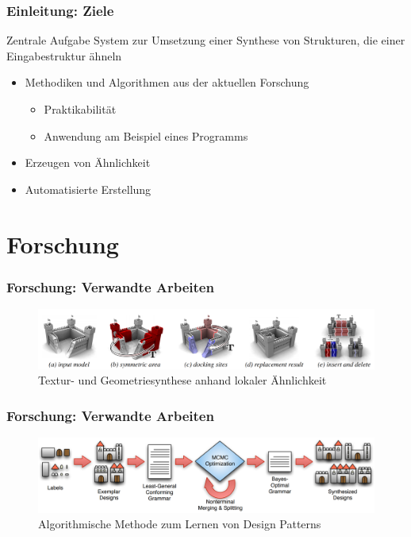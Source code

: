 \documentclass[12pt]{beamer}
\begin{document}
    \begin{frame}
        \frametitle{Einleitung: Ziele}

        \begin{block}{Zentrale Aufgabe}
            System zur Umsetzung einer Synthese von Strukturen, die einer Eingabestruktur ähneln
        \end{block}

        \begin{itemize}
            \setlength\itemsep{1.4em}
            \item Methodiken und Algorithmen aus der aktuellen Forschung
            \begin{itemize}
                \item Praktikabilität
                \item Anwendung am Beispiel eines Programms
            \end{itemize}
            \item Erzeugen von Ähnlichkeit
            \item Automatisierte Erstellung
        \end{itemize}
    \end{frame}

    \section{Forschung}
    \label{sec:forschung}
    \begin{frame}
        \frametitle{Forschung: Verwandte Arbeiten}
        
        \begin{figure}
            \centering
            \includegraphics[width=12cm]{../images/bokeloh_2010_system.PNG}
            \caption{Textur- und Geometriesynthese anhand lokaler Ähnlichkeit}
        \end{figure}
    \end{frame}

    \begin{frame}
        \frametitle{Forschung: Verwandte Arbeiten}

        \begin{figure}
            \centering
            \includegraphics[width=12cm]{../images/talton_2012_system.PNG}
            \caption{Algorithmische Methode zum Lernen von Design Patterns}
        \end{figure}
    \end{frame}
\end{document}
